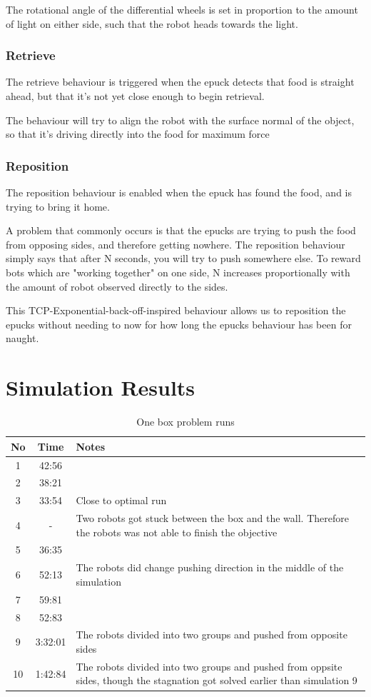 \documentclass[a4paper]{article}
\begin{document}
The rotational angle of the differential wheels is set in proportion to the amount of light on either side, such that the robot heads towards the light.

\subsubsection{Retrieve}
The retrieve behaviour is triggered when the epuck detects that food is straight ahead, but that it's not yet close enough to begin retrieval.

The behaviour will try to align the robot with the surface normal of the object, so that it's driving directly into the food for maximum force

\subsubsection{Reposition}
The reposition behaviour is enabled when the epuck has found the food, and is trying to bring it home.

A problem that commonly occurs is that the epucks are trying to push the food from opposing sides, and therefore getting nowhere. The reposition behaviour simply says that after N seconds, you will try to push somewhere else. To reward bots which are "working together" on one side, N increases proportionally with the amount of robot observed directly to the sides. 

This TCP-Exponential-back-off-inspired behaviour allows us to reposition the epucks without needing to now for how long the epucks behaviour has been for naught.

\section{Simulation Results}
\begin{table}[H]
\centering
\begin{tabular}{ c | c | p{5cm}}
\hline No & Time & Notes \\ \hline
 1 & 42:56 &  \\ \hline
 2 & 38:21 & \\ \hline
 3 & 33:54 & Close to optimal run \\ \hline
4 & - & Two robots got stuck between the box and the wall. Therefore the robots was not able to finish the objective \\ \hline
5 & 36:35 & \\ \hline
6	& 52:13 & The robots did change pushing direction in the middle of the simulation \\ \hline
7 & 59:81 & \\ \hline
8 & 52:83 & \\ \hline
9 & 3:32:01 &  The robots divided into two groups and pushed from opposite sides \\ \hline
10 & 1:42:84 & The robots divided into two groups and pushed from oppsite sides, though the stagnation got solved earlier than simulation 9 \\
\end{tabular}
\caption{One box problem runs}
\end{table}
\end{document}

